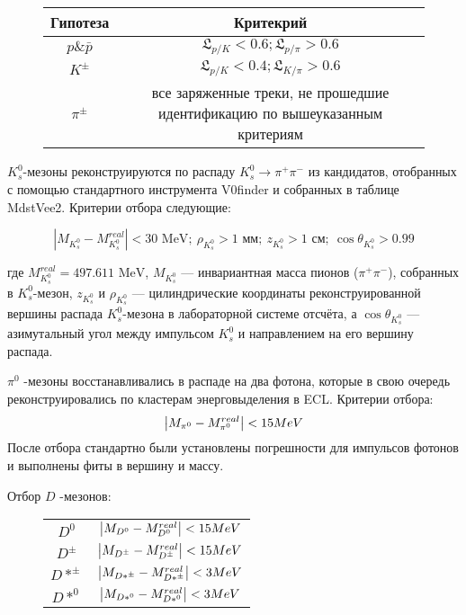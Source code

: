 \begin{figure}[h]
    \centering
    \begin{tabular}{c|c}
        Гипотеза & Критекрий \\ \hline
        $p \& \bar p$ & $\mathfrak{L}_{p/K} < 0.6; \mathfrak{L}_{p/\pi} > 0.6$ \\
        $K^\pm$   & $\mathfrak{L}_{p/K} < 0.4; \mathfrak{L}_{K/\pi} > 0.6$ \\
        $\pi^{\pm}$ & все заряженные треки, не прошедшие идентификацию по вышеуказанным критериям \\
    \end{tabular}
\end{figure}

\newdot $K_s^0$-мезоны реконструируются по распаду $K_s^0 \to \pi^+ \pi^-$ из кандидатов, отобранных с помощью стандартного инструмента V0finder и собранных в таблице MdstVee2. Критерии отбора следующие:

$$
\left| M_{K_s^0} - M^{real}_{K_s^0} \right| < 30 \text{ MeV}; \ \rho_{K_s^0} > 1 \text{ мм}; \ z_{K_s^0} > 1 \text{ см}; \ \cos \theta_{K_s^0} > 0.99
$$

где $M^{real}_{K_s^0} = 497.611 \text{ MeV}$, $M_{K_s^0}$ — инвариантная масса пионов ($\pi^+ \pi^-$), собранных в $K_s^0$-мезон, $z_{K_s^0}$ и $\rho_{K_s^0}$ — цилиндрические координаты реконструированной вершины распада $K_s^0$-мезона в лабораторной системе отсчёта, а $\cos \theta_{K_s^0}$ — азимутальный угол между импульсом $K_s^0$ и направлением на его вершину распада.

\newdot $\pi^0$ -мезоны восстанавливались в распаде на два фотона, которые в
свою очередь реконструировались по кластерам энерговыделения в ECL.
Критерии отбора:
$$
\abs{M_{\pi^0} - M_{\pi^0}^{real}} < 15 MeV 
$$
После отбора стандартно были установлены погрешности для импульсов фотонов и выполнены фиты в вершину и массу.

\newdot Отбор $D$ -мезонов:

\begin{figure}[h]
    \centering
    \begin{tabular}{c|c}
        $D^0$ & $\abs{M_{D^0} - M^{real}_{D^0}} < 15 MeV$ \\
        $D^\pm$ & $\abs{M_{D^\pm} - M^{real}_{D^\pm}} < 15 MeV$ \\
        $D*^{\pm}$ & $\abs{M_{D*^\pm} - M^{real}_{D*^\pm}} < 3 MeV$ \\
        $D*^0$ & $\abs{M_{D*^0} - M^{real}_{D*^0}} < 3 MeV$ \\
    \end{tabular}
\end{figure}

